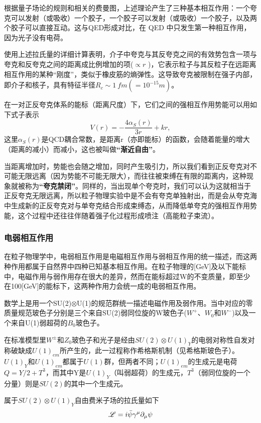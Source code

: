 根据量子场论的规则和相关的费曼图，上述理论产生了三种基本相互作用：一个夸克可以发射（或吸收）一个胶子，一个胶子可以发射（或吸收）一个胶子，以及两个胶子可以直接互动。这与QED形成对比，在 QED 中只发生第一种相互作用，因为光子没有电荷。

使用上述拉氏量的详细计算表明，介子中夸克与其反夸克之间的有效势包含一项与夸克和反夸克之间的距离成比例增加的项($\propto r$ )，它表示粒子与其反粒子在远距离相互作用的某种“刚度”，类似于橡皮筋的熵弹性。这导致夸克被限制在强子内部，即介子和核子，具有特征半径$R_c\sim\SI{1}{fm}(=10^{-15}\si{m})$。

在一对正反夸克体系的能标（距离尺度）下，它们之间的强相互作用势能可以用如下式子表示
\begin{equation}
    V(r)=-\frac{4\alpha_S(r)}{3r}+kr,
\end{equation}
这里$\alpha_S(r)$是QCD耦合常数，是距离r（亦即能标）的函数，会随着能量的增大（距离的减小）而减小，这也被叫做\textbf{“渐近自由”}。

当距离增加时，势能也会随之增加，同时产生吸引力，所以我们看到正反夸克对不可能无限远离（因为势能不可能无限大），而往往被束缚在有限的距离内，这种现象就被称为\textbf{“夸克禁闭”}。同样的，当出现单个夸克时，我们可以认为这就相当于正反夸克无限远离，所以粒子物理实验中是不会有夸克单独射出，而是会从夸克海中生成新的正反夸克对与单夸克结合形成束缚态，从而降低单夸克的强相互作用势能，这个过程中还往往伴随着强子化过程形成喷注（高能粒子束流）。


\subsubsection{电弱相互作用}
在粒子物理学中，电弱相互作用是电磁相互作用与弱相互作用的统一描述，而这两种作用都属于自然界中四种已知基本相互作用。在粒子物理的[GeV]及以下能标中，电磁作用与弱作用存在很大的差异，然而在能标超过W的不变质量，即至少在100[GeV]的能标下，这两种作用力会统一成的电弱相互作用。

数学上是用一个SU(2)$\otimes$U(1)的规范群统一描述电磁作用及弱作用。当中对应的零质量规范玻色子分别是三个来自SU(2)弱同位旋的W玻色子($W^+$、$W_0$和$W^−$)以及一个来自U(1)弱超荷的$B_0$玻色子。

在标准模型里$W^±$和$Z_0$玻色子和光子是经由$SU(2)\otimes U(1)_Y$的电弱对称性自发对称破缺成$U(1)_{em}$所产生的，此一过程称作希格斯机制（见希格斯玻色子）。$U(1)_Y$和$U(1)_{em}$都属于$U(1)$群，但两者不同；$U(1)_{em}$的生成元是电荷$Q=Y/2+T^3$，而其中Y是$U(1)_Y$（叫弱超荷）的生成元，$T^3$（弱同位旋的一个分量）则是$SU(2)$的其中一个生成元。

属于$SU(2)\otimes U(1)_Y$自由费米子场的拉氏量如下
\begin{equation}
    \mathscr{L}=i\Bar{\psi}\gamma^\mu\partial_\mu \psi
\end{equation}

